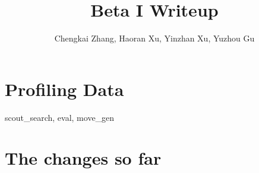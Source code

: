 \documentclass[10pt,twosidep]{article}
\begin{document}
\pagestyle{fancy}

\setlength{\parindent}{2em}
\setlength{\footskip}{30pt}
\setlength{\baselineskip}{1.3\baselineskip}

\title{Beta I Writeup}
\author{Chengkai Zhang, Haoran Xu, Yinzhan Xu, Yuzhou Gu}
\maketitle{}

\section{Profiling Data}

scout\_search, eval, move\_gen

\section{The changes so far}
\end{document}
